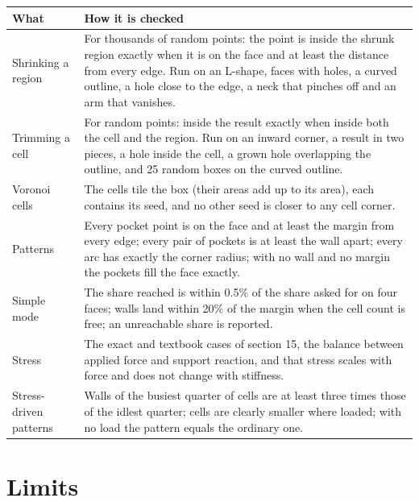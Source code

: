 \documentclass[11pt,a4paper]{article}
\begin{document}
\begin{center}
\begin{tabular}{>{\raggedright\arraybackslash}p{}>{\raggedright\arraybackslash}p{}}
\toprule
What & How it is checked \\
\midrule
Shrinking a region & For thousands of random points: the point is inside the shrunk region exactly when it is on the face and at least the distance from every edge. Run on an L-shape, faces with holes, a curved outline, a hole close to the edge, a neck that pinches off and an arm that vanishes. \\
Trimming a cell & For random points: inside the result exactly when inside both the cell and the region. Run on an inward corner, a result in two pieces, a hole inside the cell, a grown hole overlapping the outline, and 25 random boxes on the curved outline. \\
Voronoi cells & The cells tile the box (their areas add up to its area), each contains its seed, and no other seed is closer to any cell corner. \\
Patterns & Every pocket point is on the face and at least the margin from every edge; every pair of pockets is at least the wall apart; every arc has exactly the corner radius; with no wall and no margin the pockets fill the face exactly. \\
Simple mode & The share reached is within 0.5\% of the share asked for on four faces; walls land within 20\% of the margin when the cell count is free; an unreachable share is reported. \\
Stress & The exact and textbook cases of section 15, the balance between applied force and support reaction, and that stress scales with force and does not change with stiffness. \\
Stress-driven patterns & Walls of the busiest quarter of cells are at least three times those of the idlest quarter; cells are clearly smaller where loaded; with no load the pattern equals the ordinary one. \\
\bottomrule
\end{tabular}
\end{center}
 

\section{Limits}
 
\end{document}
